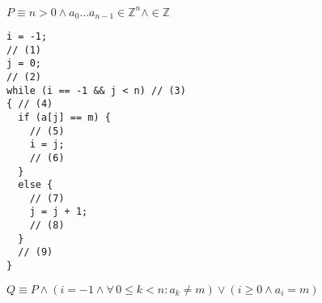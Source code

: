 \documentclass{lehramt-informatik-aufgabe}
\begin{document}
\begin{enumerate}
$P \equiv n > 0 \land a_0 \dots a_{n-1} \in \mathbb{Z}^n \land \in \mathbb{Z}$
\begin{verbatim}
i = -1;
// (1)
j = 0;
// (2)
while (i == -1 && j < n) // (3)
{ // (4)
  if (a[j] == m) {
    // (5)
    i = j;
    // (6)
  }
  else {
    // (7)
    j = j + 1;
    // (8)
  }
  // (9)
}
\end{verbatim}

$Q \equiv P \land (i = -1 \land \forall \, 0 \leq k < n \colon a_k \neq m) \lor (i \geq 0 \land a_i = m)$

\end{enumerate}
\end{document}
